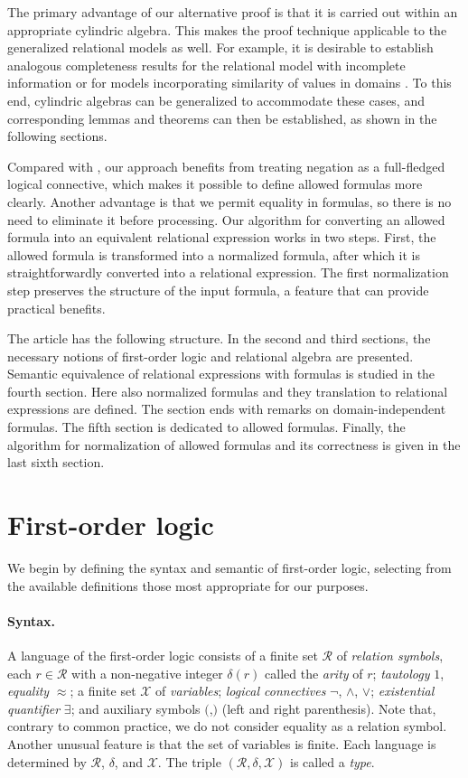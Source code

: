 \documentclass{lmcs}
\def\tu#1{( #1)}
\def\R{\mathcal R}
\def\X{\mathcal X}
\begin{document}
The primary advantage of our alternative proof is that it is carried out within an appropriate cylindric algebra. This makes the proof technique applicable to the generalized relational models as well. For example, it is desirable to establish analogous completeness results for the relational model with incomplete information \cite{La2025} or for models incorporating similarity of values in domains \cite{BeVy:Rsbmd1}. To this end, cylindric algebras can be generalized to accommodate these cases, and corresponding lemmas and theorems can then be established, as shown in the following sections. 

Compared with \cite{GelderTopoer:safety}, our approach benefits from treating negation as a full-fledged logical connective, which makes it possible to define allowed formulas more clearly. Another advantage is that we permit equality in formulas, so there is no need to eliminate it before processing. Our algorithm for converting an allowed formula into an equivalent relational expression works in two steps. First, the allowed formula is transformed into a normalized formula, after which it is straightforwardly converted into a relational expression. The first normalization step preserves the structure of the input formula, a feature that can provide practical benefits.

The article has the following structure. In the second and third sections, the necessary notions of first-order logic and relational algebra are presented. Semantic equivalence of relational expressions with formulas is studied in the fourth section. Here also normalized formulas and they translation to relational expressions are defined. The section ends with remarks on domain-independent formulas. The fifth section is dedicated to allowed formulas. Finally, the algorithm for  normalization of allowed formulas and its correctness is given in the last sixth section.


\section{First-order logic}
We begin by defining the syntax and semantic of first-order logic, selecting from the available definitions those most appropriate for our purposes.

\paragraph{Syntax.} A language of the first-order logic consists of a finite set $\R$ of \emph{relation symbols}, each $r\in \R$ with a non-negative integer $\delta(r)$ called the \emph{arity} of $r$; \emph{tautology} $1$, \emph{equality}  $\approx$; a  finite set $\X$ of \emph{variables}; \emph{logical connectives} $\neg$, $\wedge$, $\vee$; \emph{existential quantifier} $\exists$; and auxiliary symbols $($,$)$ (left and right parenthesis). Note that, contrary to common practice, we do not consider equality as a relation symbol. Another unusual feature is that the set of variables is finite. Each language is determined by $\R$, $\delta$, and $\X$. The triple $\tu{\R,\delta, \X}$ is called a \emph{type}.
\end{document}
